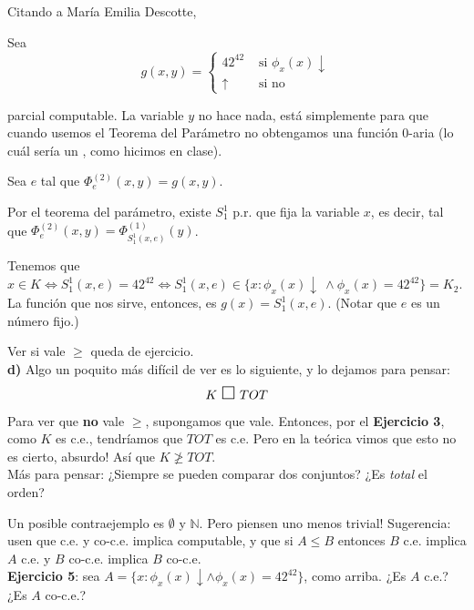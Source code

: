 \documentclass[10pt,a4paper]{article}
\def\key#1{\{#1\}}
\def\N{\mathbb{N}}
\def\bs{\mathlarger{\mathlarger{\square}}}
\begin{document}
Citando a María Emilia Descotte,  

Sea \[g(x, y) = \begin{cases}
42^{42} & \text{ si } \phi_x(x) \downarrow\\
\uparrow & \text{ si no}
\end{cases}\]

parcial computable. La variable $y$ no hace nada, está simplemente para que cuando usemos el Teorema del Parámetro no obtengamos una función 0-aria (lo cuál sería un , como hicimos en clase).

Sea $e$ tal que $\Phi^{(2)}_e(x, y) = g(x, y)$.

Por el teorema del parámetro, existe $S^1_1$ p.r. que fija la variable $x$, es decir, tal que $\Phi^{(2)}_e(x,y) = \Phi^{(1)}_{S^1_1(x,e)}(y)$.

Tenemos que $x \in K \Leftrightarrow S^1_1(x,e) = 42^{42} \Leftrightarrow S^1_1(x,e) \in \key{x : \phi_x(x) \downarrow\ \land \phi_x(x) = 42^{42}}= K_2$. La función que nos sirve, entonces, es $g(x) = S^1_1(x,e)$. (Notar que $e$ es un número fijo.)

Ver si vale $\geq$ queda de ejercicio.\\

\textbf{d)} Algo un poquito más difícil de ver es lo siguiente, y lo dejamos para pensar:
	\begin{equation*}
	K\ \bs\ TOT
	\end{equation*}
	
Para ver que \textbf{no} vale $\geq$, supongamos que vale. Entonces, por el \textbf{Ejercicio 3}, como $K$ es c.e., tendríamos que $TOT$ es c.e. Pero en la teórica vimos que esto no es cierto, absurdo! Así que $K\not\geq TOT$. \\

	

Más para pensar: ¿Siempre se pueden comparar dos conjuntos? ¿Es \textit{total} el orden? 
	
	Un posible contraejemplo es $\emptyset$ y $\N$. Pero piensen uno menos trivial! Sugerencia: usen que c.e. y co-c.e. implica computable, y que si $A \leq B$ entonces $B$ c.e. implica $A$ c.e. y $B$ co-c.e. implica $B$ co-c.e. \\
	
	\textbf{Ejercicio 5}: sea $A =\key{x : \phi_x(x) \downarrow \land \phi_x(x) = 42^{42}}$, como arriba.
	¿Es $A$ c.e.? ¿Es $A$ co-c.e.?
	
\end{document}
